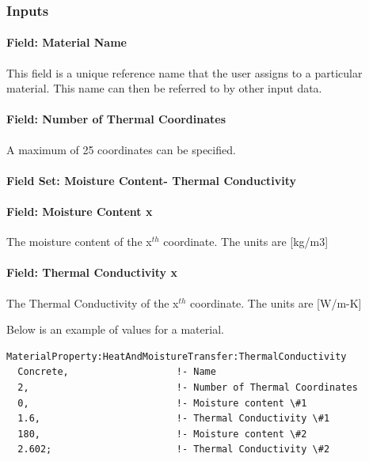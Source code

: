 \subsubsection{Inputs}\label{inputs-12-018}

\paragraph{Field: Material Name}\label{field-material-name-5}

This field is a unique reference name that the user assigns to a particular material. This name can then be referred to by other input data.

\paragraph{Field: Number of Thermal Coordinates}\label{field-number-of-thermal-coordinates}

A maximum of 25 coordinates can be specified.

\paragraph{Field Set: Moisture Content- Thermal Conductivity}\label{field-set-moisture-content--thermal-conductivity}

\paragraph{Field: Moisture Content x}\label{field-moisture-content-x-3}

The moisture content of the x\(^{th}\) coordinate. The units are {[}kg/m3{]}

\paragraph{Field: Thermal Conductivity x}\label{field-thermal-conductivity-x-1}

The Thermal Conductivity of the x\(^{th}\) coordinate. The units are {[}W/m-K{]}

Below is an example of values for a material.

\begin{lstlisting}
MaterialProperty:HeatAndMoistureTransfer:ThermalConductivity
  Concrete,                   !- Name
  2,                          !- Number of Thermal Coordinates
  0,                          !- Moisture content \#1
  1.6,                        !- Thermal Conductivity \#1
  180,                        !- Moisture content \#2
  2.602;                      !- Thermal Conductivity \#2
\end{lstlisting}

